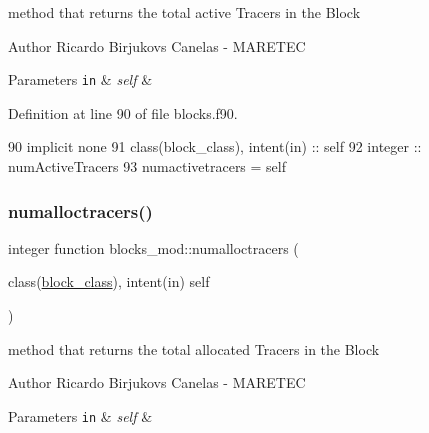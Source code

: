 method that returns the total active Tracers in the Block 

\begin{DoxyAuthor}{Author}
Ricardo Birjukovs Canelas -\/ M\+A\+R\+E\+T\+EC
\end{DoxyAuthor}

\begin{DoxyParams}[1]{Parameters}
\mbox{\tt in}  & {\em self} & \\
\hline
\end{DoxyParams}


Definition at line 90 of file blocks.\+f90.


\begin{DoxyCode}
90     \textcolor{keywordtype}{implicit none}
91     \textcolor{keywordtype}{class}(block\_class), \textcolor{keywordtype}{intent(in)} :: self
92     \textcolor{keywordtype}{integer} :: numActiveTracers
93     numactivetracers = self%
\end{DoxyCode}
\mbox{\label{namespaceblocks__mod_a7202fad0fdc07ff9111e61e3aa513af9}} 
\subsubsection{\texorpdfstring{numalloctracers()}{numalloctracers()}}
{\footnotesize\ttfamily integer function blocks\+\_\+mod\+::numalloctracers (\begin{DoxyParamCaption}\item[{class(\mbox{\hyperlink{structblocks__mod_1_1block__class}{block\+\_\+class}}), intent(in)}]{self }\end{DoxyParamCaption})\hspace{0.3cm}{\ttfamily [private]}}



method that returns the total allocated Tracers in the Block 

\begin{DoxyAuthor}{Author}
Ricardo Birjukovs Canelas -\/ M\+A\+R\+E\+T\+EC
\end{DoxyAuthor}

\begin{DoxyParams}[1]{Parameters}
\mbox{\tt in}  & {\em self} & \\
\hline
\end{DoxyParams}


